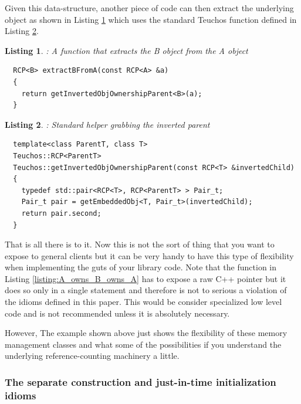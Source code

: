 \documentclass[pdf,ps2pdf,11pt]{SANDreport}
\newtheorem{listing}{Listing}
\begin{document}
Given this data-structure, another piece of code can then extract the
underlying {} object as shown in Listing
{}\ref{listing:Extract_B_from_A} which uses the standard Teuchos
function {} defined in
Listing {}\ref{listing:getInvertedObjOwnershipParent}.

\begin{listing}: A function that extracts the B object from the A object \\
\label{listing:Extract_B_from_A}
{\small\begin{verbatim}
  RCP<B> extractBFromA(const RCP<A> &a)
  {
    return getInvertedObjOwnershipParent<B>(a);
  }
\end{verbatim}}
\end{listing}


\begin{listing}: Standard helper grabbing the inverted parent \\
\label{listing:getInvertedObjOwnershipParent}
{\small\begin{verbatim}
  template<class ParentT, class T>
  Teuchos::RCP<ParentT>
  Teuchos::getInvertedObjOwnershipParent(const RCP<T> &invertedChild)
  {
    typedef std::pair<RCP<T>, RCP<ParentT> > Pair_t;
    Pair_t pair = getEmbeddedObj<T, Pair_t>(invertedChild);
    return pair.second;
  }
\end{verbatim}}
\end{listing}


That is all there is to it.  Now this is not the sort of thing that
you want to expose to general clients but it can be very handy to have
this type of flexibility when implementing the guts of your library
code.  Note that the function {} in
Listing {}\ref{listing:A_owns_B_owns_A} has to expose a raw C++
pointer but it does so only in a single statement and therefore is not
to serious a violation of the idioms defined in this paper.  This
would be consider specialized low level code and is not recommended
unless it is absolutely necessary.

However, The example shown above just shows the flexibility of these
memory management classes and what some of the possibilities if you
understand the underlying reference-counting machinery a little.


%
{}\subsubsection{The separate construction and just-in-time
initialization idioms}
\label{sec:separate-construct-init}
%
\end{document}
